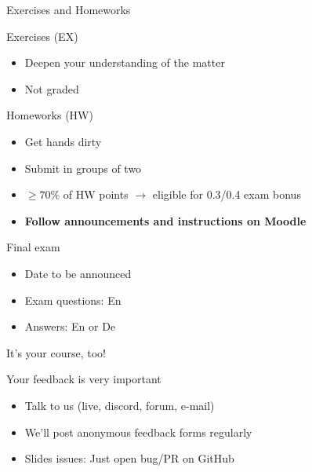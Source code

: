 \documentclass[12pt,aspectratio=169,handout]{beamer}
\begin{document}
\begin{frame}{Exercises and Homeworks}
	
Exercises (EX)

\begin{itemize}
	\item Deepen your understanding of the matter
	\item Not graded
\end{itemize}

Homeworks (HW)

\begin{itemize}
	\item Get hands dirty
	\item Submit in groups of two
	\item $\geq 70\%$ of HW points $\to$ eligible for 0.3/0.4 exam bonus
	\item \textbf{Follow announcements and instructions on Moodle}
\end{itemize}

\end{frame}

\begin{frame}{Final exam}
	
	
\begin{itemize}
\item Date to be announced
\item Exam questions: En
\item Answers: En or De
\end{itemize}

\end{frame}



\begin{frame}{It's your course, too!}
	
Your feedback is very important

\begin{itemize}
	\item Talk to us (live, discord, forum, e-mail)
	\item We'll post anonymous feedback forms regularly
	\item Slides issues: Just open bug/PR on GitHub
\end{itemize}


\end{frame}
\end{document}
